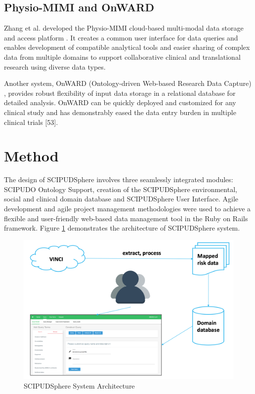 \documentclass{amia}
\begin{document}
\subsection{Physio-MIMI and OnWARD}
Zhang et al. developed the Physio-MIMI cloud-based multi-modal data storage and access platform \cite{physiomimi}. It creates a common user interface for data queries and enables development of compatible analytical tools and easier sharing of complex data from multiple domains to support collaborative clinical and translational research using diverse data types. 

Another system, OnWARD (Ontology-driven Web-based Research Data Capture) \cite{onward}, provides robust flexibility of input data storage in a relational database for detailed analysis. OnWARD can be quickly deployed and customized for any clinical study and has demonstrably eased the data entry burden in multiple clinical trials [53]. 

\section{Method}
The design of SCIPUDSphere involves three seamlessly integrated modules: SCIPUDO Ontology Support, creation of the SCIPUDSphere environmental, social and clinical domain database and SCIPUDSphere User Interface. Agile development and agile project management methodologies were used to achieve a flexible and user-friendly web-based data management tool in the Ruby on Rails framework. Figure \ref{architecture} demonstrates the architecture of SCIPUDSphere system. 

\begin{figure}[h!]
  \centering
  \includegraphics[scale=0.4]{pics/architecture.png}
  \caption{SCIPUDSphere System Architecture}
  \label{architecture}
\end{figure}
\end{document}
